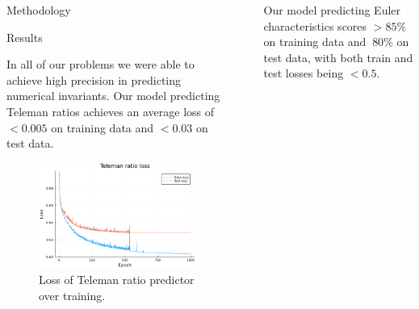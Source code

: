 \documentclass[final,20pt]{beamer}
\newlength{\sepwidth}
\newlength{\colwidth}
\newcommand{\separatorcolumn}{\begin{column}{\sepwidth}\end{column}}
\begin{document}
\begin{frame}[t]
\begin{columns}[t]
\begin{column}{\colwidth}
\begin{block}{Methodology}
  \end{block}

  \begin{block}{Results}

    In all of our problems we were able to achieve high precision in predicting
    numerical invariants.
    Our model predicting Teleman ratios achieves an average loss of
    $<0.005$ on training data and $<0.03$ on test data.

    \phantom{a}

    \begin{figure}
    \includegraphics{teleman-ratio-loss.png}
    \caption{Loss of Teleman ratio predictor over training.}
    \end{figure}
  \end{block}

\end{column}

\separatorcolumn

\begin{column}{\colwidth}
  \begin{block}

    Our model predicting Euler characteristics scores
    $>85\%$ on training data and $~80\%$ on test data,
    with both train and test losses being $<0.5$.


\end{block}
\end{column}
\end{columns}
\end{frame}
\end{document}
